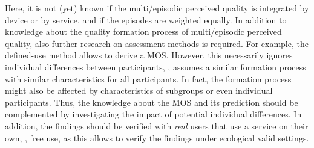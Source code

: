 Here, it is not (yet) known if the multi\-/episodic perceived quality is integrated by device or by service, and if the episodes are weighted equally.
In addition to knowledge about the quality formation process of multi\-/episodic perceived quality, also further research on assessment methods is required.
For example, the defined-use method allows to derive a \ac{MOS}.
However, this necessarily ignores individual differences between participants, \ie, assumes a similar formation process with similar characteristics for all participants.
In fact, the formation process might also be affected by characteristics of subgroups or even individual participants.
Thus, the knowledge about the \ac{MOS} and its prediction should be complemented by investigating the impact of potential individual differences.
In addition, the findings should be verified with \emph{real} users that use a service on their own, \ie, free use, as this allows to verify the findings under ecological valid settings.
